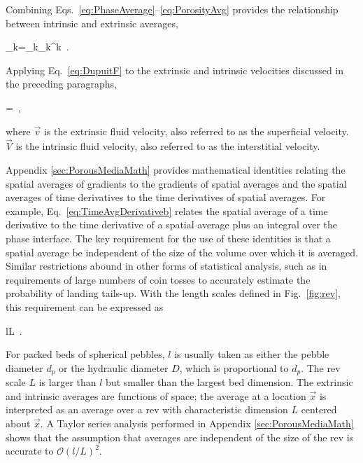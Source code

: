 Combining Eqs.\ \eqref{eq:PhaseAverage}--\eqref{eq:PorosityAvg} provides the relationship between intrinsic and extrinsic averages,

\beq
\label{eq:DupuitF}
\la\Phi_k\ra=\epsilon_k\la\Phi_k\ra^k\ .
\eeq

\noindent Applying Eq.\ \eqref{eq:DupuitF} to the extrinsic and intrinsic velocities discussed in the preceding paragraphs,

\beq
\label{eq:DupuitForchiemer}
=\epsilon{}\ ,
\eeq

\noindent where \(\vec{v}\) is the extrinsic fluid velocity, also referred to as the superficial velocity. \(\vec{V}\) is the intrinsic fluid velocity, also referred to as the interstitial velocity. 

Appendix \ref{sec:PorousMediaMath} provides mathematical identities relating the spatial averages of gradients to the gradients of spatial averages and the spatial averages of time derivatives to the time derivatives of spatial averages. For example, Eq.\ \eqref{eq:TimeAvgDerivativeb} relates the spatial average of a time derivative to the time derivative of a spatial average plus an integral over the phase interface. The key requirement for the use of these identities is that a spatial average be independent of the size of the volume over which it is averaged. Similar restrictions abound in other forms of statistical analysis, such as in requirements of large numbers of coin tosses to accurately estimate the probability of landing tails-up. With the length scales defined in Fig.\ \ref{fig:rev}, this requirement can be expressed as

\beq
\label{eq:LengthReqs}
l\ll L\ .
\eeq

\noindent For packed beds of spherical pebbles, \(l\) is usually taken as either the pebble diameter \(d_p\) or the hydraulic diameter \(D\), which is proportional to \(d_p\). The \gls{rev} scale \(L\) is larger than \(l\) but smaller than the largest bed dimension. The extrinsic and intrinsic averages are functions of space; the average at a location \(\vec{x}\) is interpreted as an average over a \gls{rev} with characteristic dimension \(L\) centered about \(\vec{x}\). A Taylor series analysis performed in Appendix \ref{sec:PorousMediaMath} shows that the assumption that averages are independent of the size of the \gls{rev} is accurate to \(\mathcal{O}(l/L)^2\).

